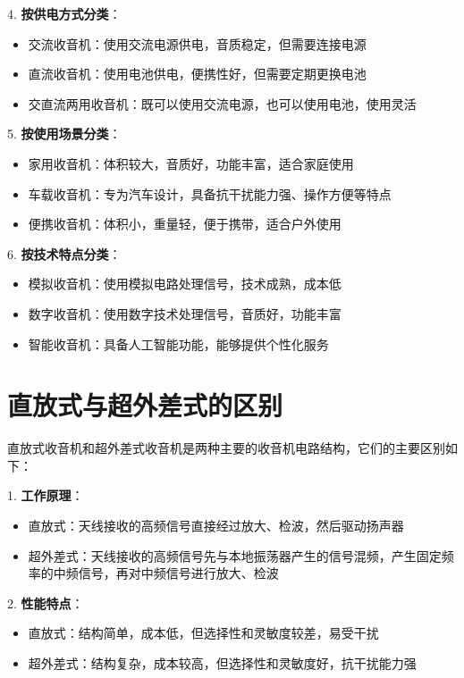 \documentclass[12pt,UTF8]{ctexbook}
\begin{document}
4. \textbf{按供电方式分类}：
   \begin{itemize}[leftmargin=3.5em]
   \item 交流收音机：使用交流电源供电，音质稳定，但需要连接电源
   \item 直流收音机：使用电池供电，便携性好，但需要定期更换电池
   \item 交直流两用收音机：既可以使用交流电源，也可以使用电池，使用灵活
   \end{itemize}

5. \textbf{按使用场景分类}：
   \begin{itemize}[leftmargin=3.5em]
   \item 家用收音机：体积较大，音质好，功能丰富，适合家庭使用
   \item 车载收音机：专为汽车设计，具备抗干扰能力强、操作方便等特点
   \item 便携收音机：体积小，重量轻，便于携带，适合户外使用
   \end{itemize}

6. \textbf{按技术特点分类}：
   \begin{itemize}[leftmargin=3.5em]
   \item 模拟收音机：使用模拟电路处理信号，技术成熟，成本低
   \item 数字收音机：使用数字技术处理信号，音质好，功能丰富
   \item 智能收音机：具备人工智能功能，能够提供个性化服务
   \end{itemize}

\section{直放式与超外差式的区别}

直放式收音机和超外差式收音机是两种主要的收音机电路结构，它们的主要区别如下：

1. \textbf{工作原理}：
   \begin{itemize}[leftmargin=3.5em]
   \item 直放式：天线接收的高频信号直接经过放大、检波，然后驱动扬声器
   \item 超外差式：天线接收的高频信号先与本地振荡器产生的信号混频，产生固定频率的中频信号，再对中频信号进行放大、检波
   \end{itemize}

2. \textbf{性能特点}：
   \begin{itemize}[leftmargin=3.5em]
   \item 直放式：结构简单，成本低，但选择性和灵敏度较差，易受干扰
   \item 超外差式：结构复杂，成本较高，但选择性和灵敏度好，抗干扰能力强
   \end{itemize}
\end{document}

